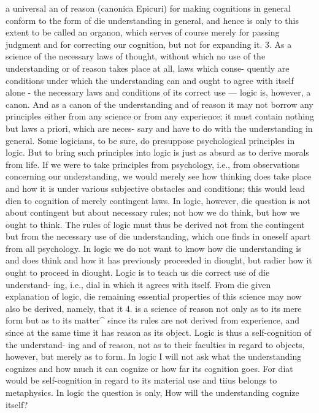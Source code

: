 a universal an of reason (canonica Epicuri) for making cognitions in general
conform to the form of die understanding in general, and hence is only to
this extent to be called an organon, which serves of course merely for
passing judgment and for correcting our cognition, but not for expanding it.
3. As a science of the necessary laws of thought, without which no use
of the understanding or of reason takes place at all, laws which conse-
quently are conditions under which the understanding can and ought to
agree with itself alone - the necessary laws and conditions of its correct
use — logic is, however, a canon. And as a canon of the understanding and
of reason it may not borrow any principles either from any science or from
any experience; it must contain nothing but laws a priori, which are neces-
sary and have to do with the understanding in general.
Some logicians, to be sure, do presuppose psychological principles in
logic. But to bring such principles into logic is just as absurd as to derive
morals from life. If we were to take principles from psychology, i.e., from
observations concerning our understanding, we would merely see how
thinking does take place and how it is under various subjective obstacles
and conditions; this would lead dien to cognition of merely contingent laws.
In logic, however, die question is not about contingent but about necessary
rules; not how we do think, but how we ought to think. The rules of logic
must thus be derived not from the contingent but from the necessary use of
die understanding, which one finds in oneself apart from all psychology.
In logic we do not want to know how die understanding is and does think
and how it has previously proceeded in diought, but radier how it ought to
proceed in diought. Logic is to teach us die correct use of die understand-
ing, i.e., dial in which it agrees with itself.
From die given explanation of logic, die remaining essential properties of
this science may now also be derived, namely, that it
4. is a science of reason not only as to its mere form but as to its matter^
since its rules are not derived from experience, and since at the same time
it has reason as its object. Logic is thus a self-cognition of the understand-
ing and of reason, not as to their faculties in regard to objects, however,
but merely as to form. In logic I will not ask what the understanding
cognizes and how much it can cognize or how far its cognition goes. For
diat would be self-cognition in regard to its material use and tiius belongs
to metaphysics. In logic the question is only, How will the understanding
cognize itself?

